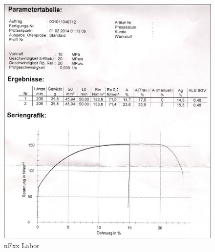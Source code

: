 \documentclass[12pt,a4paper,parskip]{scrartcl}
\begin{document}
\begin{figure}[hbtp]
\centering
\includegraphics[width=1\textwidth]{nFxxLabor.jpg}
\caption{nFxx Labor}
\end{figure}
\end{document}
